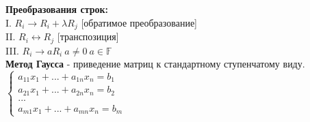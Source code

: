 \documentclass[12pt, oneside]{book}
\theoremstyle{definition}
\begin{document}
\begin{enumerate}
\textbf{Преобразования строк:}\\
I. $R_i \rightarrow R_i + \lambda R_j$ [обратимое преобразование] \\
II. $R_i \leftrightarrow R_j$ [транспозиция]\\
III. $R_i \rightarrow aR_i \ a \neq 0 \ a \in \mathbb{F}$ \\
\textbf{Метод Гаусса} - приведение матриц к стандартному ступенчатому виду. \\
$\begin{cases}
    a_{11} x_1 + ... + a_{1n} x_n = b_1
    \\
    a_{21} x_1 + ... + a_{2n} x_n = b_2
    \\
    ...
    \\
    a_{m1} x_1 + ... + a_{mn} x_n = b_m
\end{cases}$


\end{enumerate}
\end{document}
